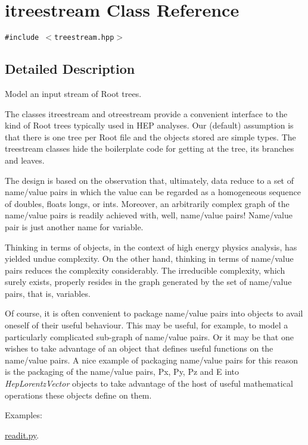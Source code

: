 \hypertarget{classitreestream}{
\section{itreestream Class Reference}
\label{classitreestream}
}
{\tt \#include $<$treestream.hpp$>$}



\subsection{Detailed Description}
Model an input stream of Root trees. 

The classes itreestream and otreestream provide a convenient interface to the kind of Root trees typically used in HEP analyses. Our (default) assumption is that there is one tree per Root file and the objects stored are simple types. The treestream classes hide the boilerplate code for getting at the tree, its branches and leaves.

The design is based on the observation that, ultimately, data reduce to a set of name/value pairs in which the value can be regarded as a homogeneous sequence of doubles, floats longs, or ints. Moreover, an arbitrarily complex graph of the name/value pairs is readily achieved with, well, name/value pairs! Name/value pair is just another name for variable.

Thinking in terms of objects, in the context of high energy physics analysis, has yielded undue complexity. On the other hand, thinking in terms of name/value pairs reduces the complexity considerably. The irreducible complexity, which surely exists, properly resides in the graph generated by the set of name/value pairs, that is, variables.

Of course, it is often convenient to package name/value pairs into objects to avail oneself of their useful behaviour. This may be useful, for example, to model a particularly complicated sub-graph of name/value pairs. Or it may be that one wishes to take advantage of an object that defines useful functions on the name/value pairs. A nice example of packaging name/value pairs for this reason is the packaging of the name/value pairs, Px, Py, Pz and E into {\em Hep\-Lorentz\-Vector\/} objects to take advantage of the host of useful mathematical operations these objects define on them. \begin{Desc}
\item[Examples: ]\par


\hyperlink{readit_8py-example}{readit.py}.\end{Desc}


